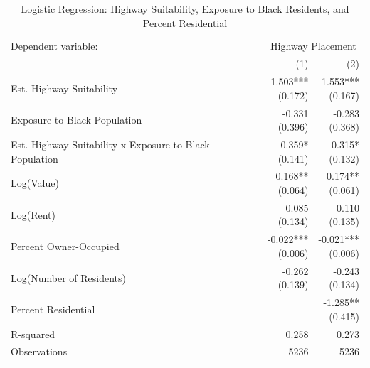 \begin{table}[h]
\centering
\caption{Logistic Regression: Highway Suitability, Exposure to Black Residents, and Percent Residential}
\label{tab:results/suitabilityxblackshare+pctres}
\begin{threeparttable}
\begin{tabular*}{1.0\textwidth}{@{\extracolsep{\fill}}l*{2}{r}}
\toprule
Dependent variable: & \multicolumn{2}{c}{Highway Placement} \\
\cmidrule(lr){2-3}
 & (1) & (2) \\
\midrule
Est. Highway Suitability & \makecell[tr]{1.503{***} \\ (0.172)} & \makecell[tr]{1.553{***} \\ (0.167)} \\
Exposure to Black Population & \makecell[tr]{-0.331 \\ (0.396)} & \makecell[tr]{-0.283 \\ (0.368)} \\
Est. Highway Suitability x Exposure to Black Population & \makecell[tr]{0.359{*} \\ (0.141)} & \makecell[tr]{0.315{*} \\ (0.132)} \\
Log(Value) & \makecell[tr]{0.168{**} \\ (0.064)} & \makecell[tr]{0.174{**} \\ (0.061)} \\
Log(Rent) & \makecell[tr]{0.085 \\ (0.134)} & \makecell[tr]{0.110 \\ (0.135)} \\
Percent Owner-Occupied & \makecell[tr]{-0.022{***} \\ (0.006)} & \makecell[tr]{-0.021{***} \\ (0.006)} \\
Log(Number of Residents) & \makecell[tr]{-0.262 \\ (0.139)} & \makecell[tr]{-0.243 \\ (0.134)} \\
Percent Residential &  & \makecell[tr]{-1.285{**} \\ (0.415)} \\
R-squared & 0.258 & 0.273 \\
Observations & 5236 & 5236 \\
\bottomrule
\end{tabular*}
\begin{tablenotes}[flushleft]
\footnotesize

\end{tablenotes}
\end{threeparttable}
\end{table}
